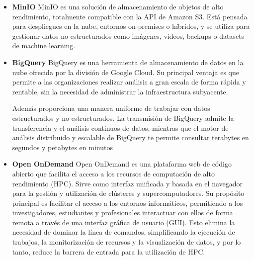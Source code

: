 \begin{itemize}
    \item \textbf{MinIO} \newline
    MinIO es una solución de almacenamiento de objetos de alto rendimiento, totalmente compatible con la API de Amazon S3. Está pensada 
    para despliegues en la nube, entornos on-premises o híbridos, y se utiliza para gestionar datos no estructurados como imágenes, vídeos, backups o datasets de machine learning. \cite{S3CompatibleExascale}

    \item \textbf{BigQuery} \newline
    BigQuery es una herramienta de almacenamiento de datos en la nube ofrecida por la división de Google Cloud. Su principal ventaja es que permite a las 
    organizaciones realizar análisis a gran escala de forma rápida y rentable, sin la necesidad de administrar la infraestructura subyacente.

    Además proporciona una manera uniforme de trabajar con datos estructurados y no estructurados. La transmisión de BigQuery admite la transferencia y 
    el análisis continuos de datos, mientras que el motor de análisis distribuido y escalable de BigQuery te permite consultar terabytes en segundos y petabytes en minutos \cite{BigQueryAIData}

    
    \item \textbf{Open OnDemand} \newline
    Open OnDemand es una plataforma web de código abierto que facilita el acceso a los recursos de computación de alto rendimiento (HPC). Sirve como interfaz unificada 
    y basada en el navegador para la gestión y utilización de clústeres y supercomputadores. Su propósito principal es facilitar el acceso a los entornos informáticos, 
    permitiendo a los investigadores, estudiantes y profesionales interactuar con ellos de forma remota a través de una interfaz gráfica de usuario (GUI). Esto elimina la 
    necesidad de dominar la línea de comandos, simplificando la ejecución de trabajos, la monitorización de recursos y la visualización de datos, y por lo tanto, reduce la 
    barrera de entrada para la utilización de HPC. \cite{OpenOnDemandConnecting2025}
\end{itemize}